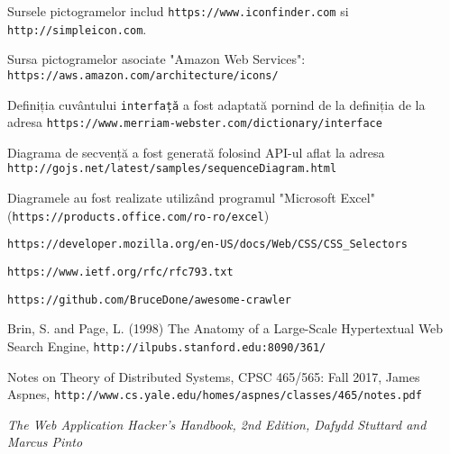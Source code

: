 \begin{thebibliography}{99}
Sursele pictogramelor includ \texttt{https://www.iconfinder.com} si \texttt{http://simpleicon.com}.

Sursa pictogramelor asociate "Amazon Web Services": \texttt{https://aws.amazon.com/architecture/icons/}

Definiția cuvântului \texttt{interfață} a fost adaptată pornind de la definiția de la adresa \texttt{https://www.merriam-webster.com/dictionary/interface}


Diagrama de secvență a fost generată folosind API-ul aflat la adresa \texttt{http://gojs.net/latest/samples/sequenceDiagram.html}

Diagramele au fost realizate utilizând programul "Microsoft Excel" (\texttt{https://products.office.com/ro-ro/excel})

\texttt{https://developer.mozilla.org/en-US/docs/Web/CSS/CSS\_Selectors}

\texttt{https://www.ietf.org/rfc/rfc793.txt}

\texttt{https://github.com/BruceDone/awesome-crawler}

Brin, S. and Page, L. (1998) The Anatomy of a Large-Scale Hypertextual Web Search Engine, \texttt{http://ilpubs.stanford.edu:8090/361/}

Notes on Theory of Distributed Systems, CPSC 465/565: Fall 2017, James Aspnes, \texttt{http://www.cs.yale.edu/homes/aspnes/classes/465/notes.pdf}

\textit{The Web Application Hacker's Handbook, 2nd Edition, Dafydd Stuttard and Marcus Pinto}

\end{thebibliography}